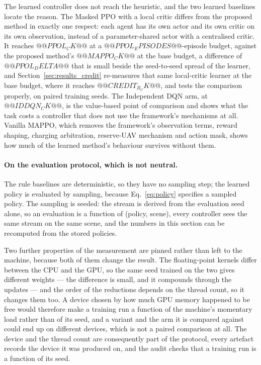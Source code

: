 The learned controller does not reach the heuristic, and the two learned
baselines locate the reason.  The Masked PPO with a local critic differs
from the proposed method in exactly one respect: each agent has its own
actor and its own critic on its own observation, instead of a
parameter-shared actor with a centralised critic.  It reaches
$@@PPOL_CK@@$ at a $@@PPOL_EPISODES@@$-episode budget, against the proposed
method's $@@MAPPO_CK@@$ at the base budget, a difference
of $@@PPOL_DELTA@@$ that is small beside the seed-to-seed spread of the
learner, and Section~\ref{sec:results_credit} re-measures that same
local-critic learner at the base budget, where it reaches
$@@CREDIT_B_CK@@$, and tests the comparison properly, on paired training
seeds.  The Independent DQN arm, at
$@@IDDQN_CK@@$, is the value-based point of comparison and shows what the
task costs a controller that does not use the framework's mechanisms at
all.  Vanilla MAPPO, which removes the
framework's observation terms, reward shaping, charging arbitration,
reserve-UAV mechanism and action mask, shows how much of the learned
method's behaviour survives without them.

\paragraph{On the evaluation protocol, which is not neutral.} The rule
baselines are deterministic, so they have no sampling step; the learned
policy is evaluated by sampling, because Eq.~\eqref{eq:policy} specifies a
sampled policy.  The sampling is seeded: the stream is derived from the
evaluation seed alone, so an evaluation is a function of (policy, scene),
every controller sees the same stream on the same scene, and the numbers in
this section can be recomputed from the stored policies.

Two further properties of the measurement are pinned rather than left to
the machine, because both of them change the result.  The floating-point
kernels differ between the CPU and the GPU, so the same seed trained on
the two gives different weights --- the difference is small, and it
compounds through the updates --- and the order of the reductions depends
on the thread count, so it changes them too.  A device chosen by how much
GPU memory happened to be free would therefore make a training run a
function of the machine's momentary load rather than of its seed, and a
variant and the arm it is compared against could end up on different
devices, which is not a paired comparison at all.  The device and the
thread count are consequently part of the protocol, every artefact records
the device it was produced on, and the audit checks that a training run is
a function of its seed.

